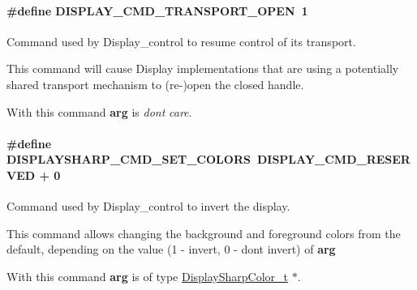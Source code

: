 \paragraph[{D\+I\+S\+P\+L\+A\+Y\+\_\+\+C\+M\+D\+\_\+\+T\+R\+A\+N\+S\+P\+O\+R\+T\+\_\+\+O\+P\+E\+N}]{\setlength{\rightskip}{0pt plus 5cm}\#define D\+I\+S\+P\+L\+A\+Y\+\_\+\+C\+M\+D\+\_\+\+T\+R\+A\+N\+S\+P\+O\+R\+T\+\_\+\+O\+P\+E\+N~1}\label{group___d_i_s_p_l_a_y___c_m_d_gae12206be356c6b2ce885b5ada9b1854d}


Command used by Display\+\_\+control to resume control of its transport. 

This command will cause Display implementations that are using a potentially shared transport mechanism to (re-\/)open the closed handle.

With this command {\bfseries arg} is {\itshape don\textquotesingle{}t} {\itshape care}. 
\paragraph[{D\+I\+S\+P\+L\+A\+Y\+S\+H\+A\+R\+P\+\_\+\+C\+M\+D\+\_\+\+S\+E\+T\+\_\+\+C\+O\+L\+O\+R\+S}]{\setlength{\rightskip}{0pt plus 5cm}\#define D\+I\+S\+P\+L\+A\+Y\+S\+H\+A\+R\+P\+\_\+\+C\+M\+D\+\_\+\+S\+E\+T\+\_\+\+C\+O\+L\+O\+R\+S~{\bf D\+I\+S\+P\+L\+A\+Y\+\_\+\+C\+M\+D\+\_\+\+R\+E\+S\+E\+R\+V\+E\+D} + 0}\label{group___d_i_s_p_l_a_y___c_m_d_ga27b9623d9abc7aa7eeae74ea7d77cd0f}


Command used by Display\+\_\+control to invert the display. 

This command allows changing the background and foreground colors from the default, depending on the value (1 -\/ invert, 0 -\/ don\textquotesingle{}t invert) of {\bfseries arg} 

With this command {\bfseries arg} is of type {\ttfamily \hyperlink{struct_display_sharp_color__t}{Display\+Sharp\+Color\+\_\+t}} $\ast$. 